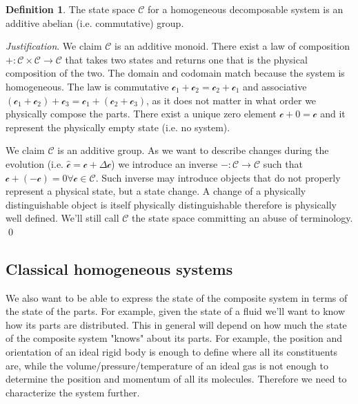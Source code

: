 \documentclass[aps,pra,10pt,twocolumn,floatfix,nofootinbib]{revtex4-1}
\theoremstyle{definition}
\newtheorem{defn}[prop]{Definition}
\newenvironment{justification}{\emph{Justification}.}{\qed}
\begin{document}
\begin{defn}\label{reducible_state_space}
The state space $\mathcal{C}$ for a homogeneous decomposable system is an additive abelian (i.e. commutative) group.
\end{defn}

\begin{justification}
We claim $\mathcal{C}$ is an additive monoid. There exist a law of composition $+ : \mathcal{C} \times \mathcal{C} \rightarrow \mathcal{C}$ that takes two states and returns one that is the physical composition of the two. The domain and codomain match because the system is homogeneous. The law is commutative $\mathcal{c}_1 +\mathcal{c}_2 = \mathcal{c}_2+\mathcal{c}_1$ and associative $(\mathcal{c}_1 + \mathcal{c}_2) + \mathcal{c}_3 = \mathcal{c}_1 + (\mathcal{c}_2 + \mathcal{c}_3)$, as it does not matter in what order we physically compose the parts. There exist a unique zero element $\mathcal{c} + 0 = \mathcal{c}$ and it represent the physically empty state (i.e. no system).

We claim $\mathcal{C}$ is an additive group. As we want to describe changes during the evolution (i.e. $\hat{\mathcal{c}} = \mathcal{c} +\Delta \mathcal{c}$) we introduce an inverse $- : \mathcal{C} \rightarrow \mathcal{C}$ such that $\mathcal{c} + ( - \mathcal{c}) = 0 \forall \mathcal{c} \in \mathcal{C}$. Such inverse may introduce objects that do not properly represent a physical state, but a state change. A change of a physically distinguishable object is itself physically distinguishable therefore is physically well defined. We'll still call $\mathcal{C}$ the state space committing an abuse of terminology.
\end{justification}

\subsection{Classical homogeneous systems}
We also want to be able to express the state of the composite system in terms of the state of the parts. For example, given the state of a fluid we'll want to know how its parts are distributed. This in general will depend on how much the state of the composite system "knows" about its parts. For example, the position and orientation of an ideal rigid body is enough to define where all its constituents are, while the volume/pressure/temperature of an ideal gas is not enough to determine the position and momentum of all its molecules. Therefore we need to characterize the system further.
\end{document}
